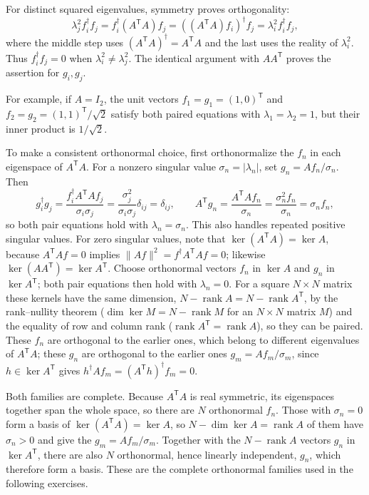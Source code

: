 For distinct squared eigenvalues, symmetry proves orthogonality:
\[
\lambda_j^2 f_i^\dagger f_j
=f_i^\dagger(A^{\mathsf T}A)f_j
=((A^{\mathsf T}A)f_i)^\dagger f_j
=\lambda_i^2 f_i^\dagger f_j,
\]
where the middle step uses $(A^{\mathsf T}A)^\dagger=A^{\mathsf T}A$
and the last uses the reality of $\lambda_i^2$.
Thus $f_i^\dagger f_j=0$ when $\lambda_i^2\ne\lambda_j^2$.
The identical argument with $AA^{\mathsf T}$ proves the assertion for
$g_i,g_j$.

 For example, if $A=I_2$, the unit vectors
$f_1=g_1=(1,0)^{\mathsf T}$ and
$f_2=g_2=(1,1)^{\mathsf T}/\sqrt2$ satisfy both paired equations with
$\lambda_1=\lambda_2=1$, but their inner product is $1/\sqrt2$.

To make a consistent orthonormal choice, first orthonormalize the
$f_n$ in each eigenspace of $A^{\mathsf T}A$. For a nonzero singular
value $\sigma_n=|\lambda_n|$, set $g_n=Af_n/\sigma_n$. Then
\[
g_i^\dagger g_j
=\frac{f_i^\dagger A^{\mathsf T}Af_j}{\sigma_i\sigma_j}
=\frac{\sigma_j^2}{\sigma_i\sigma_j}\delta_{ij}=\delta_{ij},
\qquad
A^{\mathsf T}g_n=\frac{A^{\mathsf T}Af_n}{\sigma_n}
=\frac{\sigma_n^2f_n}{\sigma_n}=\sigma_nf_n,
\]
so both pair equations hold with $\lambda_n=\sigma_n$.
This also handles repeated positive singular values. For zero singular
values, note that $\ker(A^{\mathsf T}A)=\ker A$, because
$A^{\mathsf T}Af=0$ implies $\|Af\|^2=f^\dagger A^{\mathsf T}Af=0$;
likewise $\ker(AA^{\mathsf T})=\ker A^{\mathsf T}$. Choose orthonormal
vectors $f_n$ in $\ker A$ and $g_n$ in $\ker A^{\mathsf T}$; both pair
equations then hold with $\lambda_n=0$. For a square $N\times N$ matrix
these kernels have the same dimension,
$N-\operatorname{rank}A=N-\operatorname{rank}A^{\mathsf T}$, by the
rank--nullity theorem ($\dim\ker M=N-\operatorname{rank}M$ for an
$N\times N$ matrix $M$) and the equality of row and column rank
($\operatorname{rank}A^{\mathsf T}=\operatorname{rank}A$), so they
can be paired. These $f_n$ are orthogonal to the earlier ones, which
belong to different eigenvalues of $A^{\mathsf T}A$; these $g_n$ are
orthogonal to the earlier ones $g_m=Af_m/\sigma_m$, since
$h\in\ker A^{\mathsf T}$ gives
$h^\dagger Af_m=(A^{\mathsf T}h)^\dagger f_m=0$.

Both families are complete. Because $A^{\mathsf T}A$ is real
symmetric, its eigenspaces together span the whole space, so there are
$N$ orthonormal $f_n$. Those with $\sigma_n=0$ form a basis of
$\ker(A^{\mathsf T}A)=\ker A$, so $N-\dim\ker A=\operatorname{rank}A$
of them have $\sigma_n>0$ and give the $g_m=Af_m/\sigma_m$. Together
with the $N-\operatorname{rank}A$ vectors $g_n$ in $\ker A^{\mathsf T}$,
there are also $N$ orthonormal, hence linearly independent, $g_n$,
which therefore form a basis. These are the complete orthonormal families used in the following
exercises.

